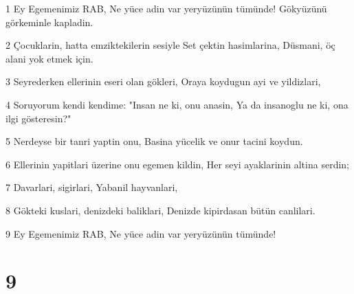 \par 1 Ey Egemenimiz RAB, Ne yüce adin var yeryüzünün tümünde! Gökyüzünü görkeminle kapladin.
\par 2 Çocuklarin, hatta emziktekilerin sesiyle Set çektin hasimlarina, Düsmani, öç alani yok etmek için.
\par 3 Seyrederken ellerinin eseri olan gökleri, Oraya koydugun ayi ve yildizlari,
\par 4 Soruyorum kendi kendime: "Insan ne ki, onu anasin, Ya da insanoglu ne ki, ona ilgi gösteresin?"
\par 5 Nerdeyse bir tanri yaptin onu, Basina yücelik ve onur tacini koydun.
\par 6 Ellerinin yapitlari üzerine onu egemen kildin, Her seyi ayaklarinin altina serdin;
\par 7 Davarlari, sigirlari, Yabanil hayvanlari,
\par 8 Gökteki kuslari, denizdeki baliklari, Denizde kipirdasan bütün canlilari.
\par 9 Ey Egemenimiz RAB, Ne yüce adin var yeryüzünün tümünde!

\chapter{9}

